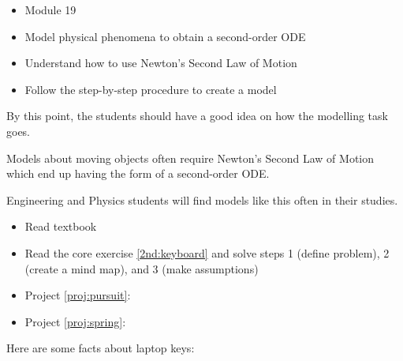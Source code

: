 \begin{lesson}

	\begin{itemize}
		\item Module 19
	\end{itemize}

	\begin{itemize}
		\item Model physical phenomena to obtain a second-order ODE
		\item Understand how to use Newton's Second Law of Motion
		\item Follow the step-by-step procedure to create a model
	\end{itemize}
	

By this point, the students should have a good idea on how the modelling task goes.

Models about moving objects often require Newton's Second Law of Motion which end up having the form of a second-order ODE.

Engineering and Physics students will find models like this often in their studies.



\begin{itemize}
	\item Read textbook
	\item Read the core exercise \ref{2nd:keyboard} and solve steps 1 (define problem), 2 (create a mind map), and 3 (make assumptions)
\end{itemize}




\begin{itemize}
	\item Project \ref{proj:pursuit}: \pursuittitle
	\item Project \ref{proj:spring}: \springtitle
\end{itemize}




\end{lesson}




\question \label{2nd:keyboard}
	Here are some facts about laptop keys:

